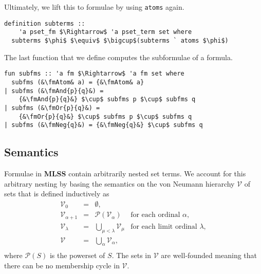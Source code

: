 \documentclass[sigplan,10pt,anonymous,review]{acmart}
\newcommand{\MLSS}{\textbf{MLSS}}
\newcommand{\fmAnd}[2]{#1 $\boldsymbol{\land}$ #2}
\newcommand{\fmOr}[2]{#1 $\boldsymbol{\lor}$ #2}
\newcommand{\fmNegSymbol}{\boldsymbol{\neg}}
\newcommand{\fmNeg}[1]{$\fmNegSymbol$ #1}
\newcommand{\fmAtom}{\textbf{A}}
\begin{document}
Ultimately, we lift this to formulae by using \lstinline!atoms! again.
\begin{lstlisting}
definition subterms ::
    'a pset_fm $\Rightarrow$ 'a pset_term set where
  subterms $\phi$ $\equiv$ $\bigcup$(subterms ` atoms $\phi$)
\end{lstlisting}
The last function that we define computes the subformulae of a formula.
\begin{lstlisting}
fun subfms :: 'a fm $\Rightarrow$ 'a fm set where
  subfms (&\fmAtom& a) = {&\fmAtom& a}
| subfms (&\fmAnd{p}{q}&) =
    {&\fmAnd{p}{q}&} $\cup$ subfms p $\cup$ subfms q
| subfms (&\fmOr{p}{q}&) =
    {&\fmOr{p}{q}&} $\cup$ subfms p $\cup$ subfms q
| subfms (&\fmNeg{q}&) = {&\fmNeg{q}&} $\cup$ subfms q
\end{lstlisting}

\subsection{Semantics}
Formulae in \MLSS{} contain arbitrarily nested set terms.
We account for this arbitrary nesting by basing the semantics on the von Neumann hierarchy $\mathcal{V}$ of sets that is defined inductively as
  \[
    \begin{array}{rclr}
      \mathcal{V}_0 & = & \emptyset, \\
      \mathcal{V}_{\alpha + 1} & = & \mathcal{P}(\mathcal{V}_\alpha) & \text{for each ordinal $\alpha$}, \\
      \mathcal{V}_{\lambda} & = & \bigcup_{\mu < \lambda} \mathcal{V}_\mu & \text{for each limit ordinal $\lambda$}, \\
      \mathcal{V} & = & \bigcup_\alpha \mathcal{V}_\alpha, \\
    \end{array}
  \]
where $\mathcal{P}(S)$ is the powerset of $S$.
The sets in $\mathcal{V}$ are well-founded meaning that there can be no membership cycle in $\mathcal{V}$.
\end{document}
